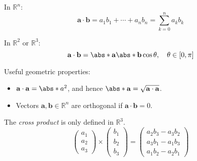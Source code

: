 \begin{multicols}{2}

    \begin{CheatsheetEntryFrame}

         

        In $\mathbb{R}^n$:
        \begin{equation*}
            \mathbf{a} \cdot \mathbf{b} = a_1 b_1 + \cdots + a_n b_n = \sum_{k=0}^n{a_k b_k}
        \end{equation*}

        In $\mathbb{R}^2$ or $\mathbb{R}^3$:
        \begin{equation*}
            \mathbf{a} \cdot \mathbf{b} = \abs*{\mathbf{a}} \abs*{\mathbf{b}} \cos{\theta}
            ,\quad \theta \in [0, \pi]
        \end{equation*}

        Useful geometric properties:
        \begin{itemize}
            \item $\mathbf{a} \cdot \mathbf{a} = \abs*{a}^2$, and hence $\abs*{\mathbf{a}} = \sqrt{\mathbf{a} \cdot \mathbf{a}}$.
            \item Vectors $\mathbf{a}, \mathbf{b} \in \mathbb{R}^n$ are orthogonal if $\mathbf{a} \cdot \mathbf{b} = 0$.
        \end{itemize}

    \end{CheatsheetEntryFrame}

    \begin{CheatsheetEntryFrame}

         

        The \textit{cross product} is only defined in $\mathbb{R}^3$.
        \begin{equation*}
            \begin{pmatrix}
                a_1 \\
                a_2 \\
                a_3
            \end{pmatrix}
            \times
            \begin{pmatrix}
                b_1 \\
                b_2 \\
                b_3
            \end{pmatrix}
            =
            \begin{pmatrix}
                a_2 b_3 - a_3 b_2 \\
                a_3 b_1 - a_1 b_3 \\
                a_1 b_2 - a_2 b_1
            \end{pmatrix}
        \end{equation*}


\end{CheatsheetEntryFrame}
\end{multicols}
